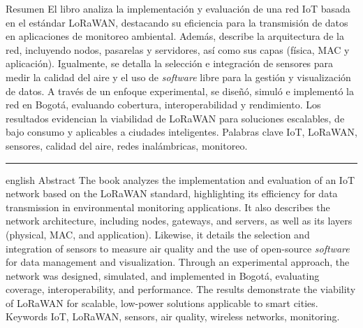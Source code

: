 \abstract
{Resumen}
{El libro analiza la implementación y evaluación de una red IoT basada en el estándar LoRaWAN, destacando su eficiencia para la transmisión de datos en aplicaciones de monitoreo ambiental. Además, describe la arquitectura de la red, incluyendo nodos, pasarelas y servidores, así como sus capas (física, MAC y aplicación). Igualmente, se detalla la selección e integración de sensores para medir la calidad del aire y el uso de \emph{software} libre para la gestión y visualización de datos. A través de un enfoque experimental, se diseñó, simuló e implementó la red en Bogotá, evaluando cobertura, interoperabilidad y rendimiento. Los resultados evidencian la viabilidad de LoRaWAN para soluciones escalables, de bajo consumo y aplicables a ciudades inteligentes.}
{Palabras clave}
{IoT, LoRaWAN, sensores, calidad del aire, redes inalámbricas, monitoreo.}

\noindent\rule{1.8cm}{0.4pt}

\vspace{3mm}

\begin{otherlanguage*}{english}
  \abstract
  {Abstract}
  {The book analyzes the implementation and evaluation of an IoT network based on the LoRaWAN standard, highlighting its efficiency for data transmission in environmental monitoring applications. It also describes the network architecture, including nodes, gateways, and servers, as well as its layers (physical, MAC, and application). Likewise, it details the selection and integration of sensors to measure air quality and the use of open-source \emph{software} for data management and visualization. Through an experimental approach, the network was designed, simulated, and implemented in Bogotá, evaluating coverage, interoperability, and performance. The results demonstrate the viability of LoRaWAN for scalable, low-power solutions applicable to smart cities.}
  {Keywords}
  {IoT, LoRaWAN, sensors, air quality, wireless networks, monitoring.}
\end{otherlanguage*}

\vspace{1cm}

\hfill{}
